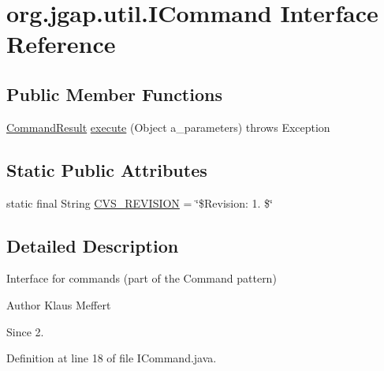 \hypertarget{interfaceorg_1_1jgap_1_1util_1_1_i_command}{\section{org.\-jgap.\-util.\-I\-Command Interface Reference}
\label{interfaceorg_1_1jgap_1_1util_1_1_i_command}
}
\subsection*{Public Member Functions}
\begin{DoxyCompactItemize}
\item 
\hyperlink{classorg_1_1jgap_1_1util_1_1_command_result}{Command\-Result} \hyperlink{interfaceorg_1_1jgap_1_1util_1_1_i_command_a589e79fbc5808100211c4252713cee70}{execute} (Object a\-\_\-parameters)  throws Exception
\end{DoxyCompactItemize}
\subsection*{Static Public Attributes}
\begin{DoxyCompactItemize}
\item 
static final String \hyperlink{interfaceorg_1_1jgap_1_1util_1_1_i_command_a7befd04a4fd0d15a6f05583f15004c5e}{C\-V\-S\-\_\-\-R\-E\-V\-I\-S\-I\-O\-N} = \char`\"{}\$Revision\-: 1. \$\char`\"{}
\end{DoxyCompactItemize}


\subsection{Detailed Description}
Interface for commands (part of the Command pattern)

\begin{DoxyAuthor}{Author}
Klaus Meffert 
\end{DoxyAuthor}
\begin{DoxySince}{Since}
2. 
\end{DoxySince}


Definition at line 18 of file I\-Command.\-java.




